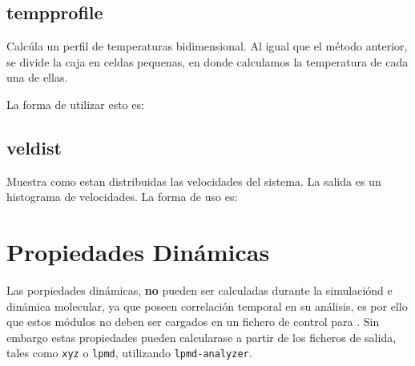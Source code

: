 \subsection{tempprofile}
Calc\'ula un perfil de temperaturas bidimensional. Al igual que el m\'etodo anterior, se divide la caja en celdas pequenas, en donde calculamos la temperatura de cada una de ellas.

La forma de utilizar esto es:


\subsection{veldist}
Muestra como estan distribuidas las velocidades del sistema. La salida es un histograma de velocidades. La forma de uso es:


\section{Propiedades Din\'amicas}
Las porpiedades din\'amicas, \textbf{no} pueden ser calculadas durante la simulaci\'ond e din\'amica molecular, ya que poseen correlaci\'on temporal en su an\'alisis, es por ello que estos m\'odulos no deben ser cargados en un fichero de control para {\lpmd}. Sin embargo estas propiedades pueden calcularase a partir de los ficheros de salida, tales como \verb|xyz| o \verb|lpmd|, utilizando \verb|lpmd-analyzer|.
